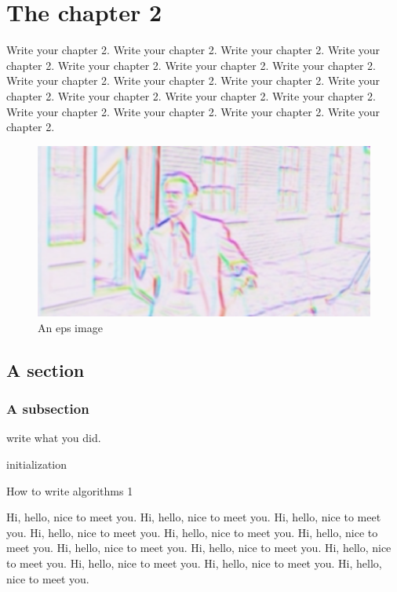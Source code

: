 
\chapter{The chapter 2}\label{chapter2}

Write your chapter 2. Write your chapter 2. Write your chapter 2. Write your chapter 2. Write your chapter 2. Write your chapter 2. Write your chapter 2. Write your chapter 2. Write your chapter 2. Write your chapter 2. Write your chapter 2. Write your chapter 2. Write your chapter 2. Write your chapter 2. Write your chapter 2. Write your chapter 2. Write your chapter 2. Write your chapter 2. 

\begin{figure}
\centering
\includegraphics[scale=0.5]{imgs/HOG.eps}
\caption{An eps image}
\label{fig:hog}
\end{figure}

\section{A section} \label{chap2:sec1}
\subsection{A subsection} \label{sec1:1-1}

write what you did.


\begin{algorithm}[H]
  initialization\;
  \caption{How to write algorithms 1}
\end{algorithm}


Hi, hello, nice to meet you. Hi, hello, nice to meet you. Hi, hello, nice to meet you. Hi, hello, nice to meet you. Hi, hello, nice to meet you. Hi, hello, nice to meet you. Hi, hello, nice to meet you. Hi, hello, nice to meet you. Hi, hello, nice to meet you. Hi, hello, nice to meet you. Hi, hello, nice to meet you. Hi, hello, nice to meet you. 

